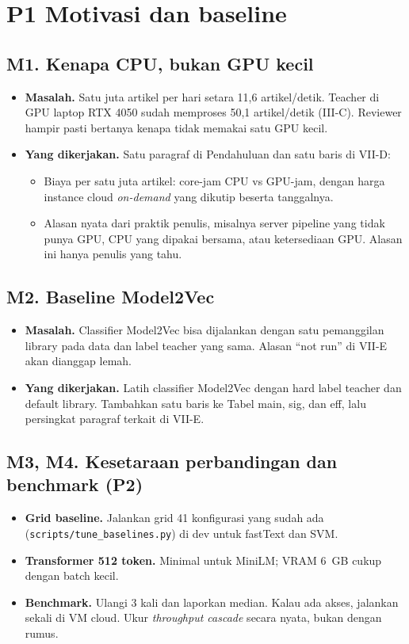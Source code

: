 \documentclass[10pt,a4paper]{article}
\newcommand{\po}{\textcolor{orange!75!black}{\textbf{P1}}}
\newcommand{\pt}{\textcolor{blue!60!black}{\textbf{P2}}}
\begin{document}
\section{\po{} Motivasi dan baseline}

\subsection*{M1. Kenapa CPU, bukan GPU kecil}
\begin{itemize}
  \item \textbf{Masalah.} Satu juta artikel per hari setara 11,6 artikel/detik. Teacher di GPU laptop RTX 4050 sudah memproses 50,1 artikel/detik (III-C). Reviewer hampir pasti bertanya kenapa tidak memakai satu GPU kecil.
  \item \textbf{Yang dikerjakan.} Satu paragraf di Pendahuluan dan satu baris di VII-D:
  \begin{itemize}
    \item Biaya per satu juta artikel: core-jam CPU vs GPU-jam, dengan harga instance cloud \emph{on-demand} yang dikutip beserta tanggalnya.
    \item Alasan nyata dari praktik penulis, misalnya server pipeline yang tidak punya GPU, CPU yang dipakai bersama, atau ketersediaan GPU. Alasan ini hanya penulis yang tahu.
  \end{itemize}
\end{itemize}

\subsection*{M2. Baseline Model2Vec}
\begin{itemize}
  \item \textbf{Masalah.} Classifier Model2Vec bisa dijalankan dengan satu pemanggilan library pada data dan label teacher yang sama. Alasan ``not run'' di VII-E akan dianggap lemah.
  \item \textbf{Yang dikerjakan.} Latih classifier Model2Vec dengan hard label teacher dan default library. Tambahkan satu baris ke Tabel main, sig, dan eff, lalu persingkat paragraf terkait di VII-E.
\end{itemize}

\subsection*{M3, M4. Kesetaraan perbandingan dan benchmark (\pt)}
\begin{itemize}
  \item \textbf{Grid baseline.} Jalankan grid 41 konfigurasi yang sudah ada (\texttt{scripts/tune\_baselines.py}) di dev untuk fastText dan SVM.
  \item \textbf{Transformer 512 token.} Minimal untuk MiniLM; VRAM 6~GB cukup dengan batch kecil.
  \item \textbf{Benchmark.} Ulangi 3 kali dan laporkan median. Kalau ada akses, jalankan sekali di VM cloud. Ukur \emph{throughput cascade} secara nyata, bukan dengan rumus.
\end{itemize}
\end{document}
